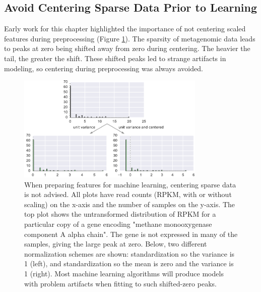 \subsection{Avoid Centering Sparse Data Prior to Learning}
\label{sect:centering_sparse}
Early work for this chapter highlighted the importance of not centering scaled features during preprocessing (Figure \ref{fig:standard_scaler}).
The sparsity of metagenomic data leads to peaks at zero being shifted away from zero during centering. %
The heavier the tail, the greater the shift. %
These shifted peaks led to strange artifacts in modeling, so centering during preprocessing was always avoided.

\begin{figure}[H]
\centering
    \includegraphics[width=0.8\textwidth]{./tex/chapter3/figures/170324_standard_scalar.pdf}
    \begin{singlespace}
    \caption[Feature scaling: centering sparse features is not advised]{
        When preparing features for machine learning, centering sparse data is not advised.
        All plots have read counts (RPKM, with or without scaling) on the x-axis and the number of samples on the y-axis.
        The top plot shows the untransformed distribution of RPKM for a particular copy of a gene encoding
            "methane monooxygenase component A alpha chain".
        The gene is not expressed in many of the samples, giving the large peak at zero.
        Below, two different normalization schemes are shown:
            standardization so the variance is 1 (left), and
            standardization so the mean is zero and the variance is 1 (right).
        Most machine learning algorithms will produce models with problem artifacts when fitting to such shifted-zero peaks.
        }
    \label{fig:standard_scaler}
    \end{singlespace}
\end{figure}

